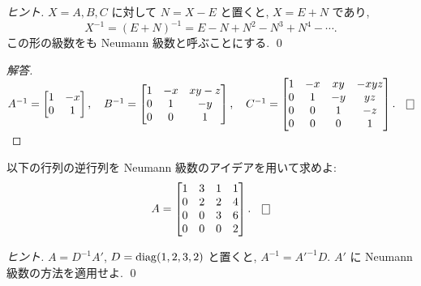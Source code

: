 \documentclass[12pt,twoside]{jarticle}
\newcommand\commentout[1]{#1}
\newcommand\commentout[1]{}
\begin{document}
\begin{proof}[ヒント]
  $X = A,B,C$ に対して $N=X-E$ と置くと, $X=E+N$ であり,
  \begin{equation*}
    X^{-1} = (E+N)^{-1} = E - N + N^2 - N^3 + N^4 - \cdots.
  \end{equation*}
  この形の級数をも Neumann 級数と呼ぶことにする. \qed
\end{proof}

\commentout{{\small
\begin{proof}[解答]
  \quad\(
    A^{-1} =
    \begin{bmatrix}
      1 & -x \\
      0 & 1 \\
    \end{bmatrix},
    \quad
    B^{-1} = 
    \begin{bmatrix}
      1 & -x & xy - z \\
      0 &  1 & -y \\
      0 &  0 & 1 \\
    \end{bmatrix},
    \quad
    C^{-1} =
    \begin{bmatrix}
      1 & -x & xy & -xyz \\
      0 &  1 & -y & yz \\
      0 &  0 &  1 & -z \\
      0 &  0 &  0 & 1 \\
    \end{bmatrix}.
    \qed
  \)
\end{proof}
}}

\begin{question}
  \label{q:inv-unip-mat-2}
  以下の行列の逆行列を Neumann 級数のアイデアを用いて求めよ:
  \begin{equation*}
    A = 
    \begin{bmatrix}
      1 & 3 & 1 & 1 \\
      0 & 2 & 2 & 4 \\
      0 & 0 & 3 & 6 \\
      0 & 0 & 0 & 2 \\
    \end{bmatrix}.
    \qed
  \end{equation*}
\end{question}

\begin{proof}[ヒント]
  $A = D^{-1}A'$, $D=\mathop{\mathrm{diag}}\nolimits(1,2,3,2)$ と置くと, $A^{-1}=A'^{-1}D$. 
  $A'$ に Neumann 級数の方法を適用せよ. \qed
\end{proof}
\end{document}
